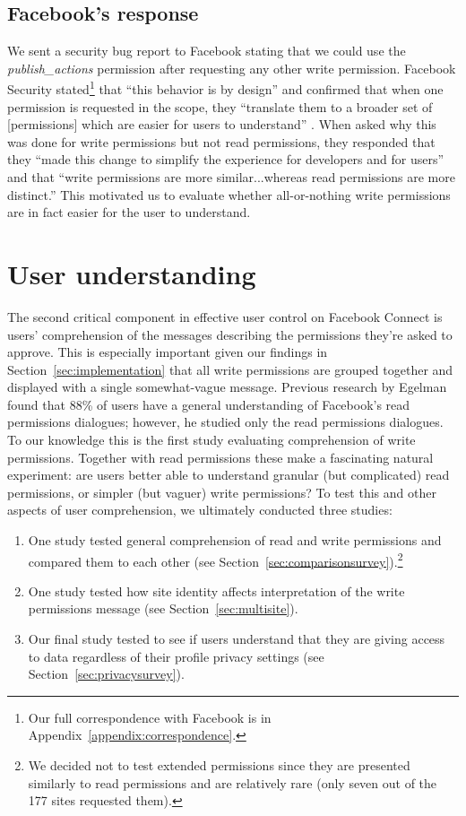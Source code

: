 \documentclass{sig-alternate}
\begin{document}
\subsection{Facebook's response}
\label{sec:fbresponse}

We sent a security bug report to Facebook stating that we could use the \emph{publish\_actions} permission after requesting any other write permission. Facebook Security stated\footnote{Our full correspondence with Facebook is in Appendix~\ref{appendix:correspondence}.} that ``this behavior is by design'' and confirmed that when one permission is requested in the scope, they ``translate them to a broader set of [permissions] which are easier for users to understand'' \cite{fbsecurity}. When asked why this was done for write permissions but not read permissions, they responded that they ``made this change to simplify the experience for developers and for users'' and that ``write permissions are more similar...whereas read permissions are more distinct.'' 
This motivated us to evaluate whether all-or-nothing write permissions are in fact easier for the user to understand.%


\section{User understanding}
\label{sec:understanding}

The second critical component in effective user control on Facebook Connect is users' comprehension of the messages describing the permissions they're asked to approve.
This is especially important given our findings in Section~\ref{sec:implementation} that all write permissions are grouped together and displayed with a single somewhat-vague message. 
Previous research  by Egelman \cite{egelman} found that 88\% of users have a general understanding of Facebook's read permissions dialogues; however, he studied only the read permissions dialogues.
To our knowledge this is the first study evaluating comprehension of write permissions.
Together with read permissions these make a fascinating natural experiment: are users better able to understand granular (but complicated) read permissions, or simpler (but vaguer) write permissions?
To test this and other aspects of user comprehension, we ultimately conducted three studies:

\begin{enumerate}
  \item One study tested general comprehension of read and write permissions and compared them to each other (see Section~\ref{sec:comparisonsurvey}).\footnote{We decided not to test extended permissions since they are presented similarly to read permissions and are relatively rare (only seven out of the 177 sites requested them).} 
  \item One study tested how site identity affects interpretation of the write permissions message (see Section~\ref{sec:multisite}).
  \item Our final study tested to see if users understand that they are giving access to data regardless of their profile privacy settings (see Section~\ref{sec:privacysurvey}).
\end{enumerate}
\end{document}
